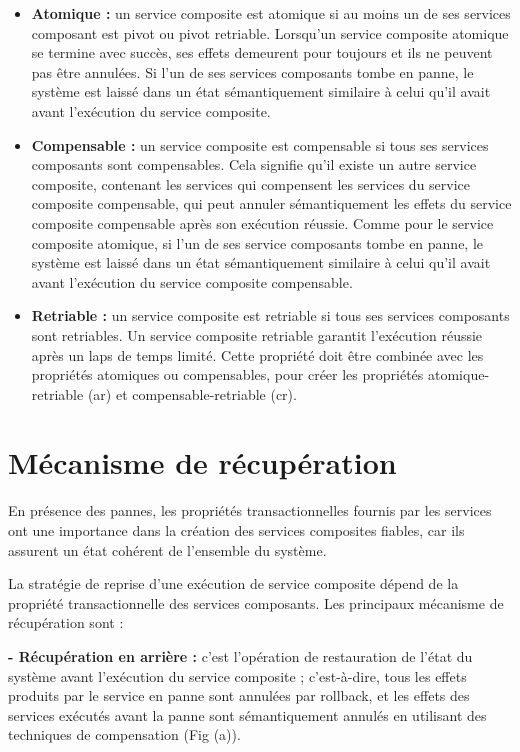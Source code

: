  \begin{itemize}
 
    \item \textbf{ Atomique : } un service composite est atomique si au moins un de ses services composant est pivot ou pivot retriable. Lorsqu’un service composite atomique se termine avec succès, ses effets demeurent pour toujours et ils ne peuvent pas être annulées. Si l’un de ses services composants tombe en panne, le système est laissé dans un état sémantiquement similaire à celui qu’il avait avant l’exécution du service composite.
    
    \item \textbf{Compensable : } un service composite est compensable si tous ses services composants sont compensables. Cela signifie qu’il existe un autre service composite, contenant les services qui compensent les services du service composite compensable, qui peut annuler sémantiquement les effets du service composite compensable après son exécution réussie. Comme pour le service composite atomique, si l’un de ses service composants tombe en panne, le système est laissé dans un état sémantiquement similaire à celui qu’il avait avant l’exécution du service composite compensable.
    
    \item \textbf{Retriable : }un service composite est retriable si tous ses services composants sont retriables. Un service composite retriable garantit l’exécution réussie après un laps de temps limité. Cette propriété doit être combinée avec les propriétés atomiques ou compensables, pour créer les propriétés atomique-retriable (ar) et compensable-retriable (cr).

\end{itemize}


\section{Mécanisme de récupération}

En présence des pannes, les propriétés transactionnelles fournis par les services ont une importance dans la création des services composites fiables, car ils assurent un état cohérent de l'ensemble du système.

La stratégie de reprise d'une exécution de service composite dépend de la propriété transactionnelle des services composants.
Les principaux mécanisme de récupération sont \cite{1} : 

\textbf{- Récupération en arrière :} c'est l'opération de restauration de l’état du système avant l’exécution du service composite ; c’est-à-dire, tous les effets produits par le service en panne sont annulées par rollback, et les effets des services exécutés avant la panne sont sémantiquement annulés en utilisant des techniques de compensation (Fig (a)).


